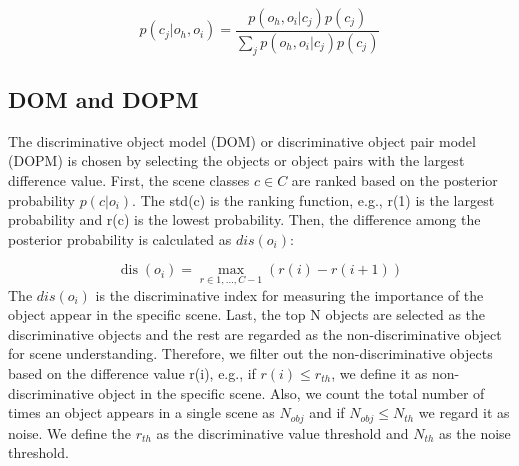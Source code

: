 \begin{equation}
p\left(c_{j} | o_{h},o_{i}\right)=\frac{p\left(o_{h},o_{i} | c_{j}\right) p\left(c_{j}\right)}{\sum_{j} p\left(o_{h},o_{i} | c_{j}\right) p\left(c_{j}\right)}
\end{equation}




\subsection{\textbf{DOM and DOPM}}
The discriminative object model (DOM) or discriminative object pair model (DOPM) is chosen by selecting the objects or object pairs with the largest difference value. First, the scene classes $c \in C$ are ranked based on the posterior probability $p(c|o_i)$. The std(c) is the ranking function, e.g., r(1) is the largest probability and r(c) is the lowest probability. Then, the difference among the posterior probability is calculated as $dis(o_i)$:

\begin{equation}
\operatorname{dis}\left(o_{i}\right)=\max _{r \in 1, \ldots, C-1}(r(i)-r(i+1))
\end{equation}
The $dis(o_i)$ is the discriminative index for measuring the importance of the object appear in the specific scene. Last, the top N objects are selected as the discriminative objects and the rest are regarded as the non-discriminative object for scene understanding. Therefore, we filter out the non-discriminative objects based on the difference value r(i), e.g., if $r(i) \le r_{th}$, we define it as non-discriminative object in the specific scene. Also, we count the total number of times an object appears in a single scene as $N_{obj}$ and if $N_{obj} \le N_{th}$ we regard it as noise. We define the $r_{th}$ as the discriminative value threshold and $N_{th}$ as the noise threshold.


